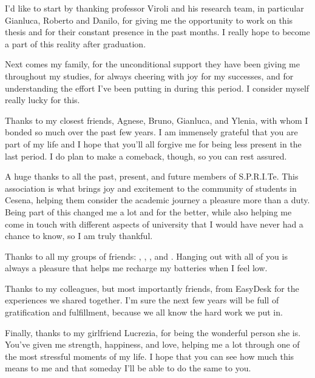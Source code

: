 \begin{acknowledgements}
    I'd like to start by thanking professor Viroli and his research team, in particular Gianluca, Roberto and Danilo, for giving me the opportunity to work on this thesis and for their constant presence in the past months.
    I really hope to become a part of this reality after graduation.

    Next comes my family, for the unconditional support they have been giving me throughout my studies, for always cheering with joy for my successes, and for understanding the effort I've been putting in during this period.
    I consider myself really lucky for this.

    Thanks to my closest friends, Agnese, Bruno, Gianluca, and Ylenia, with whom I bonded so much over the past few years.
    I am immensely grateful that you are part of my life and I hope that you'll all forgive me for being less present in the last period.
    I do plan to make a comeback, though, so you can rest assured.

    A huge thanks to all the past, present, and future members of S.P.R.I.Te.
    This association is what brings joy and excitement to the community of students in Cesena, helping them consider the academic journey a pleasure more than a duty.
    Being part of this changed me a lot and for the better, while also helping me come in touch with different aspects of university that I would have never had a chance to know, so I am truly thankful.
    
    Thanks to all my groups of friends: , , , and .
    Hanging out with all of you is always a pleasure that helps me recharge my batteries when I feel low.

    Thanks to my colleagues, but most importantly friends, from EasyDesk for the experiences we shared together.
    I'm sure the next few years will be full of gratification and fulfillment, because we all know the hard work we put in.

    Finally, thanks to my girlfriend Lucrezia, for being the wonderful person she is.
    You've given me strength, happiness, and love, helping me a lot through one of the most stressful moments of my life.
    I hope that you can see how much this means to me and that someday I'll be able to do the same to you.
\end{acknowledgements}